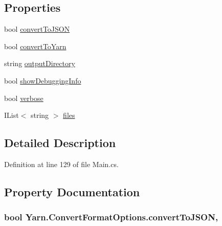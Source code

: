 \subsection*{Properties}
\begin{DoxyCompactItemize}
\item 
bool \hyperlink{a00060_a6a650914fcde92ba06fb5f140af27f11}{convert\-To\-J\-S\-O\-N}
\item 
bool \hyperlink{a00060_a052d6f00647c503adc5a79a1ff92cdf4}{convert\-To\-Yarn}
\item 
string \hyperlink{a00060_ab636bde93c2204b2af1a9306560d9749}{output\-Directory}
\item 
bool \hyperlink{a00043_a89964ea17bd19caf00cb5bff563ed01c}{show\-Debugging\-Info}
\item 
bool \hyperlink{a00043_ada4d83d1756918f362d55f6649b82b17}{verbose}
\item 
I\-List$<$ string $>$ \hyperlink{a00043_aa93cbb1bc1d5328e0a417012621e92d2}{files}
\end{DoxyCompactItemize}


\subsection{Detailed Description}


Definition at line 129 of file Main.\-cs.



\subsection{Property Documentation}
\hypertarget{a00060_a6a650914fcde92ba06fb5f140af27f11}{
\subsubsection[{convert\-To\-J\-S\-O\-N}]{\setlength{\rightskip}{0pt plus 5cm}bool Yarn.\-Convert\-Format\-Options.\-convert\-To\-J\-S\-O\-N\hspace{0.3cm}{\ttfamily [get]}, {\ttfamily [set]}}}\label{a00060_a6a650914fcde92ba06fb5f140af27f11}


